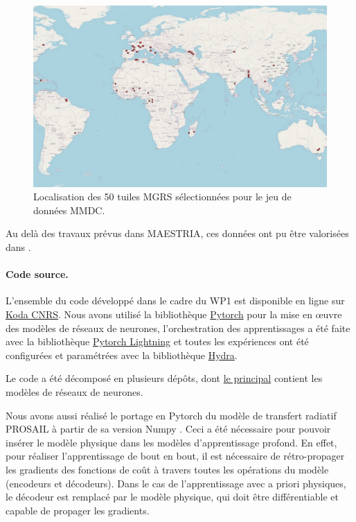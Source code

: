 \begin{figure}[htbp]
\begin{center}
\includegraphics[width=\columnwidth]{img/wp1/tiles.pdf}
\caption{Localisation des 50 tuiles MGRS sélectionnées pour le jeu de données MMDC.}
\label{fig:mmdctiles}
\end{center}
\end{figure}

Au delà des travaux prévus dans MAESTRIA, ces données ont pu être valorisées dans \citep{dumeur-2023-self-satel}.

\paragraph{Code source.}
L’ensemble du code développé dans le cadre du WP1 est disponible en ligne sur \href{https://src.koda.cnrs.fr/mmdc}{Koda CNRS}. Nous avons utilisé la bibliothèque \href{https://pytorch.org/}{Pytorch} pour la mise en œuvre des modèles de réseaux de neurones, l’orchestration des apprentissages a été faite avec la bibliothèque \href{https://lightning.ai/}{Pytorch Lightning} et toutes les expériences ont été configurées et paramétrées avec la bibliothèque \href{https://hydra.cc/}{Hydra}.

Le code a été décomposé en plusieurs dépôts, dont \href{https://src.koda.cnrs.fr/mmdc/mmdc-singledate}{le principal} contient les modèles de réseaux de neurones.

Nous avons aussi réalisé le portage en Pytorch du modèle de transfert radiatif PROSAIL \cite{jacquemoud-2009-prosp-sail-model} à partir de sa version Numpy \cite{domenzain19}. Ceci a été nécessaire pour pouvoir insérer le modèle physique dans les modèles d’apprentissage profond. En effet, pour réaliser l’apprentissage de bout en bout, il est nécessaire de rétro-propager les gradients des fonctions de coût à travers toutes les opérations du modèle (encodeurs et décodeurs). Dans le cas de l’apprentissage avec a priori physiques, le décodeur est remplacé par le modèle physique, qui doit être différentiable et capable de propager les gradients.


